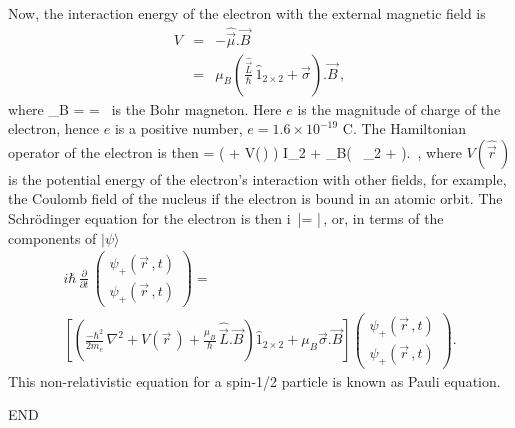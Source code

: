 \paragraph{}
Now, the interaction energy of the electron with the external magnetic field is
\begin{eqnarray}
V &=& -\hat{\vec{\mu}}.\vec{B} \nonumber \\
& = & \mu_{B}\left( \frac{\hat{\vec{L}}}{\hbar}\, \hat{1}_{2\times 2} + \vec{\sigma} \right).\vec{B} \, ,
\end{eqnarray}
where
\be
\mu_B =  = \, 
\ee
is the Bohr magneton. Here $e$ is the magnitude of charge of the electron, hence $e$ is a positive number,
$e=1.6\times 10^{-19}$ C. The Hamiltonian operator of the electron is then
\be
{} = \left(  + V(\,) \right ) I_{2} + \mu_{B}\left( \, _{2} + \vec{\sigma} \right).\, ,
\ee
where $V(\hat{\vec{r}}\,)$ is the potential energy of the electron's interaction with other fields, for example, the Coulomb field of the nucleus if the electron is bound in an atomic orbit. The Schr\"{o}dinger equation for the electron is then
\be
i\hbar {}\, |\psi\rangle =  |\psi\rangle\,,
\ee
or, in terms of the components of $|\psi\rangle$
\begin{multline}
i \hbar\, \frac{\partial}{\partial t}\, \begin{pmatrix}\psi_+(\vec{r}\, , t)\\ \psi_+(\vec{r}\, , t) \end{pmatrix}
= \\ \left[ \left( \frac{-\hbar^2}{2m_e}\, \nabla^2 + V(\vec{r}\,) + \frac{\mu_B}{\hbar}\, \hat{\vec{L}}.\vec{B}\right)
\hat{1}_{2\times 2} + \mu_B \vec{\sigma}.\vec{B}\right]
\begin{pmatrix}\psi_+(\vec{r}\, , t)\\ \psi_+(\vec{r}\, , t) \end{pmatrix}.
\end{multline}
This non-relativistic equation for a spin-1/2 particle is known as Pauli equation.

\vspace{1 cm}
\large{ \begin{center}END\end{center}}



